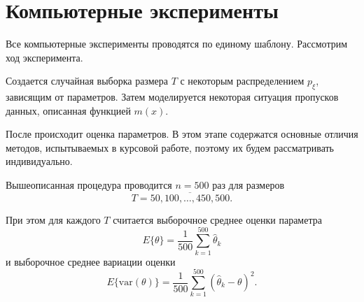 \section{Компьютерные эксперименты}

    Все компьютерные эксперименты проводятся по единому шаблону. Рассмотрим ход эксперимента.

    Создается случайная выборка размера $T$ с некоторым распределением $p_\xi$, зависящим от параметров. Затем 
    моделируется некоторая ситуация пропусков данных, описанная функцией $m(x)$.

    После происходит оценка параметров. В этом этапе содержатся основные отличия методов, испытываемых в курсовой 
    работе, поэтому их будем рассматривать индивидуально.

    Вышеописанная процедура проводится $n = 500$ раз для размеров 
    \[
        T = \overline{50, 100, \dotsc, 450, 500}.
    \]

    При этом для каждого $T$ считается выборочное среднее оценки параметра 
    \begin{equation*}
        E\{\theta\} = \frac{1}{500}\sum_{k=1}^{500}\hat{\theta}_k
    \end{equation*}
    и выборочное среднее вариации оценки
    \begin{equation*}
        E\{\mathrm{var}(\theta)\} = \frac{1}{500}\sum_{k=1}^{500}(\hat{\theta}_k - \theta)^2.
    \end{equation*}